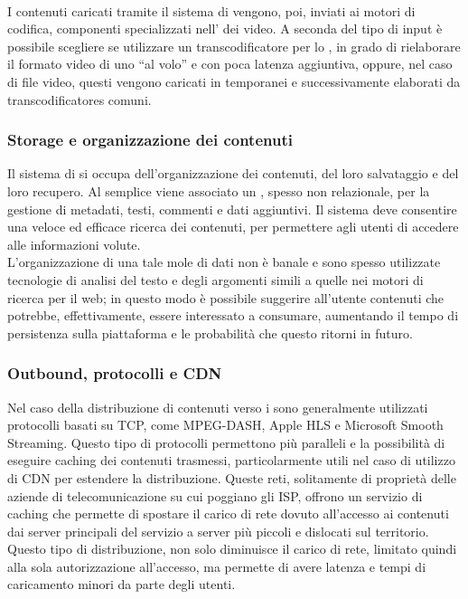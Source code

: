 			\paragraph*{}
			I contenuti caricati tramite il sistema di  vengono, poi, inviati ai motori di codifica, componenti specializzati nell' dei video. A seconda del tipo di input è possibile scegliere se utilizzare un \gls{transcodificatore} per lo , in grado di rielaborare il formato video di uno  ``al volo'' e con poca latenza aggiuntiva, oppure, nel caso di file video, questi vengono caricati in  temporanei e successivamente elaborati da \glspl{transcodificatore} comuni.

		\subsubsection{Storage e organizzazione dei contenuti}
			Il sistema di  si occupa dell'organizzazione dei contenuti, del loro salvataggio e del loro recupero. Al semplice  viene associato un , spesso non relazionale, per la gestione di metadati, testi, commenti e dati aggiuntivi. Il sistema deve consentire una veloce ed efficace ricerca dei contenuti, per permettere agli utenti di accedere alle informazioni volute.
			\\
			L'organizzazione di una tale mole di dati non è banale e sono spesso utilizzate tecnologie di analisi del testo e degli argomenti simili a quelle nei motori di ricerca per il web; in questo modo è possibile suggerire all'utente contenuti che potrebbe, effettivamente, essere interessato a consumare, aumentando il tempo di persistenza sulla piattaforma e le probabilità che questo ritorni in futuro.

		\subsubsection{Outbound, protocolli e \gls{CDN}}
			Nel caso della distribuzione di contenuti verso i  sono generalmente utilizzati protocolli basati su \gls{TCP}, come \gls{MPEG-DASH}, Apple \gls{HLS} e Microsoft Smooth Streaming. Questo tipo di protocolli permettono più  paralleli e la possibilità di eseguire caching dei contenuti trasmessi, particolarmente utili nel caso di utilizzo di \gls{CDN} per estendere la distribuzione. Queste reti, solitamente di proprietà delle aziende di telecomunicazione su cui poggiano gli \gls{ISP}, offrono un servizio di caching che permette di spostare il carico di rete dovuto all'accesso ai contenuti dai server principali del servizio a server più piccoli e dislocati sul territorio. Questo tipo di distribuzione, non solo diminuisce il carico di rete, limitato quindi alla sola autorizzazione all'accesso, ma permette di avere latenza e tempi di caricamento minori da parte degli utenti.			


